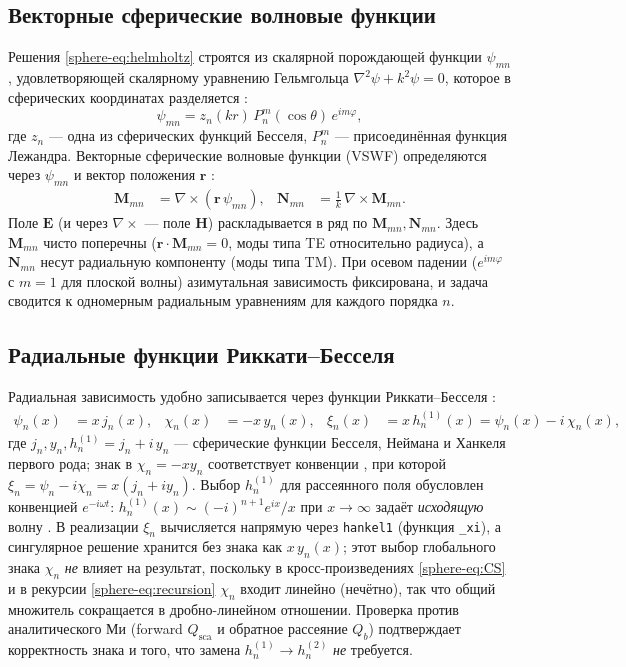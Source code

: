 \documentclass[11pt,a4paper]{article}
\begin{document}
\subsection{Векторные сферические волновые функции}

Решения \eqref{sphere-eq:helmholtz} строятся из скалярной порождающей функции $\psi_{mn}$, удовлетворяющей скалярному уравнению Гельмгольца $\nabla^2\psi+k^2\psi=0$, которое в сферических координатах разделяется \cite{eisenhart1934,stratton1941}:
\begin{equation}
\psi_{mn}=z_n(kr)\,P_n^{m}(\cos\theta)\,e^{im\varphi},
\label{sphere-eq:scalar-gen}
\end{equation}
где $z_n$ --- одна из сферических функций Бесселя, $P_n^m$ --- присоединённая функция Лежандра. Векторные сферические волновые функции (VSWF) определяются через $\psi_{mn}$ и вектор положения $\bm{r}$ \cite{stratton1941,bohren1983,mishchenko2002}:
\begin{align}
\bm{M}_{mn} &= \nabla\times(\bm{r}\,\psi_{mn}), &
\bm{N}_{mn} &= \frac{1}{k}\,\nabla\times\bm{M}_{mn}.
\label{sphere-eq:MN-def}
\end{align}
Поле $\bm{E}$ (и через $\nabla\times$ --- поле $\bm{H}$) раскладывается в ряд по $\bm{M}_{mn},\bm{N}_{mn}$. Здесь $\bm{M}_{mn}$ чисто поперечны ($\bm{r}\cdot\bm{M}_{mn}=0$, моды типа TE относительно радиуса), а $\bm{N}_{mn}$ несут радиальную компоненту (моды типа TM). При осевом падении ($e^{im\varphi}$ с $m=1$ для плоской волны) азимутальная зависимость фиксирована, и задача сводится к одномерным радиальным уравнениям для каждого порядка $n$.

\subsection{Радиальные функции Риккати--Бесселя}

Радиальная зависимость удобно записывается через функции Риккати--Бесселя \cite{bohren1983,dlmf}:
\begin{align}
\psi_n(x) &= x\,j_n(x), &
\chi_n(x) &= -x\,y_n(x), &
\xi_n(x) &= x\,h_n^{(1)}(x)=\psi_n(x)-i\,\chi_n(x),
\label{sphere-eq:riccati}
\end{align}
где $j_n,y_n,h_n^{(1)}=j_n+i\,y_n$ --- сферические функции Бесселя, Неймана и Ханкеля первого рода; знак в $\chi_n=-xy_n$ соответствует конвенции \cite{bohren1983}, при которой $\xi_n=\psi_n-i\chi_n=x(j_n+iy_n)$. Выбор $h_n^{(1)}$ для рассеянного поля обусловлен конвенцией $e^{-i\omega t}$: $h_n^{(1)}(x)\sim(-i)^{n+1}e^{ix}/x$ при $x\to\infty$ задаёт \emph{исходящую} волну \cite{bohren1983,mishchenko2002}. В реализации $\xi_n$ вычисляется напрямую через \texttt{hankel1} (функция \texttt{\_xi}), а сингулярное решение хранится без знака как $x\,y_n(x)$; этот выбор глобального знака $\chi_n$ \emph{не} влияет на результат, поскольку в кросс-произведениях \eqref{sphere-eq:CS} и в рекурсии \eqref{sphere-eq:recursion} $\chi_n$ входит линейно (нечётно), так что общий множитель сокращается в дробно-линейном отношении. Проверка против аналитического Ми (forward $Q_{\text{sca}}$ и обратное рассеяние $Q_b$) подтверждает корректность знака и того, что замена $h_n^{(1)}\to h_n^{(2)}$ \emph{не} требуется.
\end{document}
